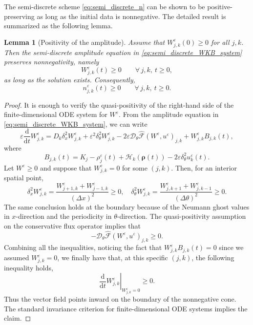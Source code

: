\documentclass[11pt]{article}
\newtheorem{lemma}{Lemma}[section]
\begin{document}
The semi-discrete scheme \eqref{eq:semi_discrete_n} can be shown to be positive-preserving 
as long as the initial data is nonnegative. 
The detailed result is summarized as the following lemma. 

\begin{lemma}[Positivity of the amplitude]
\label{lem:positivity_W}
Assume that \(W_{j,k}^\varepsilon(0)\ge0\) for all \(j,k\). Then the
semi-discrete amplitude equation in \eqref{eq:semi_discrete_WKB_system}
preserves nonnegativity, namely
\[
    W_{j,k}^\varepsilon(t)\ge0
    \qquad
    \forall\,j,k,\ t\ge0,
\]
as long as the solution exists. Consequently,
\[
    n_{j,k}^\varepsilon(t)\ge0
    \qquad
    \forall\,j,k,\ t\ge0 .
\]
\end{lemma}

\begin{proof}
It is enough to verify the quasi-positivity of the right-hand side of the
finite-dimensional ODE system for \(W^\varepsilon\). From the amplitude
equation in \eqref{eq:semi_discrete_WKB_system}, we can write
\[
\varepsilon \frac{\mathrm d}{\mathrm dt}W_{j,k}^\varepsilon
=
D_k\delta_x^2W_{j,k}^\varepsilon
+
\varepsilon^2\delta_\theta^2W_{j,k}^\varepsilon
-
2\varepsilon
\mathcal D_\theta\widehat{\mathcal F}(W^\varepsilon,u^\varepsilon)_{j,k}
+
W_{j,k}^\varepsilon B_{j,k}(t),
\]
where
\[
B_{j,k}(t)
=
K_j-\rho_{j}^\varepsilon(t)
+\mathcal H_k(\boldsymbol\rho(t))
-2\varepsilon\delta_\theta^2u_k^\varepsilon(t).
\]
Let \(W^\varepsilon\ge0\) and suppose that
\(W_{j,k}^\varepsilon=0\) for some \((j,k)\). Then, for an interior spatial
point,
\[
\delta_x^2W_{j,k}^\varepsilon
=
\frac{W_{j+1,k}^\varepsilon+W_{j-1,k}^\varepsilon}{(\Delta x)^2}
\ge0, 
\quad 
\delta_\theta^2W_{j,k}^\varepsilon
=
\frac{W_{j,k+1}^\varepsilon+W_{j,k-1}^\varepsilon}{(\Delta\theta)^2}
\ge0 .
\]
The same conclusion holds at the boundary because of the Neumann ghost
values in $x$-direction and the periodicity in \(\theta\)-direction. 
The quasi-positivity assumption on the conservative flux operator implies that 
\[
    -
    \mathcal D_\theta\widehat{\mathcal F}(W^\varepsilon,u^\varepsilon)_{j,k}
    \ge0 .
\]
Combining all the inequalities, noticing the fact that 
\(
    W_{j,k}^\varepsilon B_{j,k}(t)=0 
\)
since we assumed $W_{j,k}^\varepsilon=0$, 
we finally have that, at this specific $(j,k)$, the following inequality holds, 
\[
\left.
\frac{\mathrm d}{\mathrm dt}W_{j,k}^\varepsilon
\right|_{W_{j,k}^\varepsilon=0}
\ge0 .
\]
Thus the vector field points inward on the boundary of the nonnegative cone.
The standard invariance criterion for finite-dimensional ODE systems implies
the claim.
\end{proof}
\end{document}
